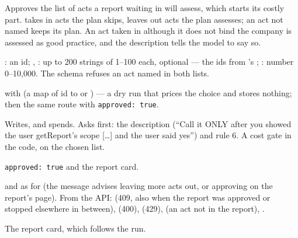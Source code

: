 \begin{description}[style=multiline, leftmargin=19mm, labelwidth=17mm, labelsep=2mm,
  font=\sffamily\bfseries\footnotesize\color{ink}, itemsep=1pt, topsep=2pt, before=\raggedright]
  \item[Does] Approves the list of acts a report waiting in  will assess,
    which starts its costly part.  takes in acts the plan skips,  leaves
    out acts the plan assesses; an act not named keeps its plan. An act taken in although it
    does not bind the company is assessed as good practice, and the description tells the
    model to say so.
  \item[Input] : an id; , : up to 200 strings of 1--100
    each, optional --- the ids from 's ; :
    number 0--10,000. The schema refuses an act named in both lists.
  \item[Calls]  with  (a map of id to
     or ) --- a dry run that prices the choice and stores nothing;
    then the same route with \texttt{approved: true}.
  \item[Kind] Writes, and spends. Asks first: the description (\enquote{Call it ONLY after you
    showed the user getReport's scope […] and the user said yes}) and rule 6. A cost gate in
    the code, on the chosen list.
  \item[Returns] \texttt{approved: true} and the report card.
  \item[Errors]  and  as for
     (the message advises leaving more acts out, or approving on
    the report's page). From the API:  (409, also when the report was
    approved or stopped elsewhere in between),  (400),
     (429),  (an act not in the report),
    .
  \item[Console] The report card, which follows the run.
\end{description}

